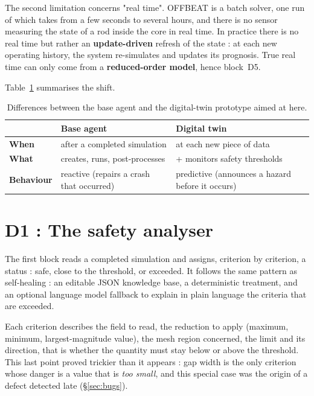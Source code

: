 \documentclass[12pt,a4paper]{report}
\begin{document}
The second limitation concerns "real time". OFFBEAT is a batch solver, one run
of which takes from a few seconds to several hours, and there is no sensor
measuring the state of a rod inside the core in real time. In practice there is
no real time but rather an \textbf{update-driven} refresh of the state : at each
new operating history, the system re-simulates and updates its prognosis. True
real time can only come from a \textbf{reduced-order model}, hence block~D5.

Table~\ref{tab:agent-vs-twin} summarises the shift.

\begin{table}[htbp]
\centering
\caption[Base agent versus digital-twin prototype]{Differences between the base
agent and the digital-twin prototype aimed at here.}
\label{tab:agent-vs-twin}
\begin{tabularx}{0.95\textwidth}{@{}lXX@{}}
\toprule
 & \textbf{Base agent} & \textbf{Digital twin}\\
\midrule
\textbf{When} & after a completed simulation & at each new piece of data\\
\textbf{What} & creates, runs, post-processes & + monitors safety thresholds\\
\textbf{Behaviour} & reactive (repairs a crash that occurred) &
  predictive (announces a hazard before it occurs)\\
\bottomrule
\end{tabularx}
\end{table}

\section{D1 : The safety analyser}

The first block reads a completed simulation and assigns, criterion by
criterion, a status : safe, close to the threshold, or exceeded. It follows
the same pattern as self-healing : an editable JSON knowledge base, a
deterministic treatment, and an optional language model fallback to explain in
plain language the criteria that are exceeded.

Each criterion describes the field to read, the reduction to apply (maximum,
minimum, largest-magnitude value), the mesh region concerned, the limit and its
direction, that is whether the quantity must stay below or above the threshold.
This last point
proved trickier than it appears : gap width is the only criterion whose danger is
a value that is \textit{too small}, and this special case was the origin of a
defect detected late (§\ref{sec:bugs}).
\end{document}
